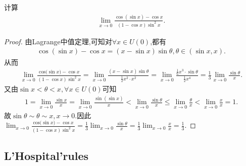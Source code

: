 \documentclass[../../main.tex]{subfiles}
\begin{document}
\begin{example}
计算
\begin{align*}
\lim_{x \to 0} \frac{\cos(\sin x) - \cos x}{(1 - \cos x)\sin^{2}x}.
\end{align*}
\end{example}
\begin{proof}
由Lagrange中值定理,可知对$\forall x\in U\left( 0 \right)$,都有
\begin{align*}
\cos \left( \sin x \right) -\cos x=\left( x-\sin x \right) \sin \theta ,\theta \in \left( \sin x,x \right) .
\end{align*}
从而
\begin{align*}
\lim_{x\rightarrow 0} \frac{\mathrm{cos(}\sin x)-\cos x}{(1-\cos x)\sin ^2x}=\lim_{x\rightarrow 0} \frac{\left( x-\sin x \right) \sin \theta}{\frac{1}{2}x^2\cdot x^2}=\lim_{x\rightarrow 0} \frac{\frac{1}{6}x^3\cdot \sin \theta}{\frac{1}{2}x^4}=\frac{1}{3}\lim_{x\rightarrow 0} \frac{\sin \theta}{x}.
\end{align*}
又由$\sin x<\theta <x,\forall x\in U\left( 0 \right)$可知
\begin{align*}
1=\lim_{x\rightarrow 0} \frac{\sin x}{x}=\lim_{x\rightarrow 0} \frac{\sin \left( \sin x \right)}{x}<\lim_{x\rightarrow 0} \frac{\sin \theta}{x}\leqslant \lim_{x\rightarrow 0} \frac{\theta}{x}<\lim_{x\rightarrow 0} \frac{x}{x}=1.
\end{align*}
故$\sin \theta \sim \theta \sim x,x\rightarrow 0$.因此$\lim_{x\rightarrow 0} \frac{\mathrm{cos(}\sin x)-\cos x}{(1-\cos x)\sin ^2x}=\frac{1}{3}\lim_{x\rightarrow 0} \frac{\sin \theta}{x}=\frac{1}{3}\lim_{x\rightarrow 0} \frac{x}{x}=\frac{1}{3}$.
\end{proof}



\subsection{L'Hospital'rules}
\end{document}
